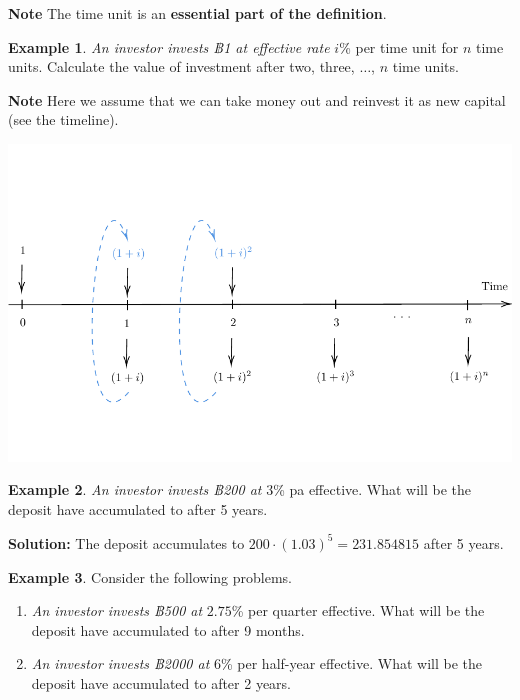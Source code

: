 \documentclass[
]{book}
\theoremstyle{definition}
\theoremstyle{definition}
\newtheorem{example}{Example}[chapter]
\theoremstyle{definition}
\theoremstyle{definition}
\theoremstyle{remark}
\begin{document}
\textbf{Note} The time unit is an \textbf{essential part of the definition}.

\begin{example}
\emph{An investor invests ฿1 at effective rate} \(i\)\% per time unit for \(n\)
time units. Calculate the value of investment after two, three,
\(\ldots\), \(n\) time units.
\end{example}

\textbf{Note} Here we assume that we can take money out and reinvest it as
new capital (see the timeline).

\begin{center}\includegraphics{SCMA266Bookdownproj_files/figure-latex/tikz-ex6-1} \end{center}

\begin{example}
\emph{An investor invests ฿200 at} \(3\)\% pa effective. What will be the
deposit have accumulated to after 5 years.
\end{example}

\textbf{Solution:} The deposit accumulates to
\(200 \cdot (1.03)^5 = 231.854815\) after 5 years.

\begin{example}

Consider the following problems.

\begin{enumerate}
\def\labelenumi{\arabic{enumi}.}
\item
  \emph{An investor invests ฿500 at} \(2.75\)\% per quarter effective. What
  will be the deposit have accumulated to after 9 months.
\item
  \emph{An investor invests ฿2000 at} \(6\)\% per half-year effective. What
  will be the deposit have accumulated to after 2 years.
\end{enumerate}

\end{example}
\end{document}
